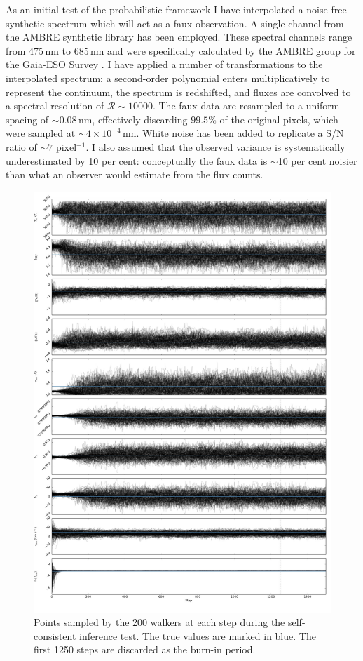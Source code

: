 \documentclass[iop]{emulateapj}
\begin{document}
As an initial test of the probabilistic framework I have interpolated a 
noise-free synthetic spectrum which will act as a faux observation. A single 
channel from the AMBRE synthetic library \citep{ambre} has been employed. These 
spectral channels range from 475\,nm to 685\,nm and were specifically calculated 
by the AMBRE group for the Gaia-ESO Survey \citep{gaia-eso}. I have applied a number of transformations to the 
interpolated spectrum: a second-order polynomial enters multiplicatively to 
represent the continuum, the spectrum is redshifted, and fluxes are convolved 
to a spectral resolution of $\mathcal{R} \sim 10000$. The faux data are resampled 
to a uniform spacing of $\sim{}0.08$\,nm, effectively discarding $99.5\%$ of 
the original pixels, which were sampled at $\sim4\times10^{-4}$\,nm. White noise  
has been added to replicate a S/N ratio of $\sim 7$ pixel$^{-1}$. I also assumed 
that the observed variance is systematically underestimated by 10 per cent: 
conceptually the faux data is $\sim{}$10 per cent noisier than what an observer 
would estimate from the flux counts. 


\begin{figure}
\label{fig:chains}
\includegraphics[height=\textheight]{chains.pdf}
\caption{Points sampled by the 200 walkers at each step during the self-consistent 
inference test. The true values are marked in blue. The first 1250 steps are 
discarded as the burn-in period.}
\end{figure}
\end{document}
